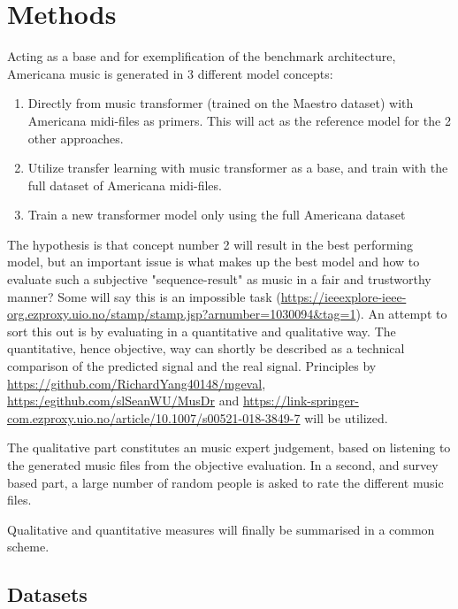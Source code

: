 \documentclass{article}
\begin{document}
    \section{Methods}

        Acting as a base and for exemplification of the benchmark architecture,
        Americana music is generated in 3 different model concepts:
        \begin{enumerate}
            \item Directly from music transformer (trained on the Maestro dataset)
                    with Americana midi-files as primers.
                    This will act as the reference model for the 2 other approaches.
            \item Utilize transfer learning with music transformer as a base, and
                    train with the full dataset of Americana midi-files.
            \item Train a new transformer model only using the full Americana dataset
        \end{enumerate} 
        
        The hypothesis is that concept number 2 will result in the best performing model,
        but an important issue is what makes up the best model and how to evaluate such a
        subjective "sequence-result" as music in a fair and trustworthy manner?
        Some will say this is an impossible task
        (\url{https://ieeexplore-ieee-org.ezproxy.uio.no/stamp/stamp.jsp?arnumber=1030094&tag=1}).
        An attempt to sort this out is by evaluating in a quantitative and qualitative way.
        The quantitative, hence objective, way can shortly be described as a technical
        comparison of the predicted signal and the real signal. Principles by
        \url{https://github.com/RichardYang40148/mgeval}, \url{https:/egithub.com/slSeanWU/MusDr} and
        \url{https://link-springer-com.ezproxy.uio.no/article/10.1007/s00521-018-3849-7} will be utilized.
        
        The qualitative part constitutes an music expert judgement,
        based on listening to the generated music files from the objective evaluation.
        In a second, and survey based part, a large number of random people is asked
        to rate the different music files.
        
        Qualitative and quantitative measures will finally be summarised in a common scheme.
        
    \subsection{Datasets}
    
\end{document}
